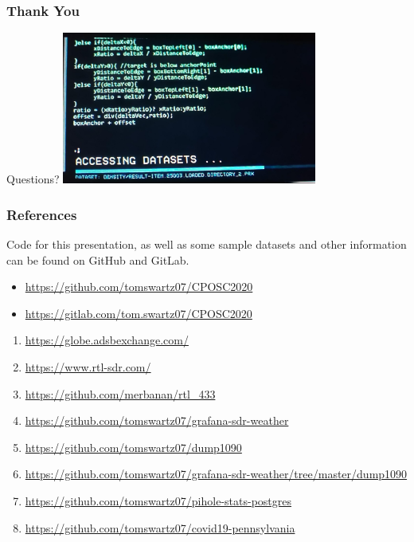 \documentclass[aspectratio=169]{beamer}
\begin{document}
\begin{frame}
  \frametitle{Thank You}
  \begin{center}
    \LARGE{Questions?}
    \vfill
    \includegraphics[height=5cm]{images/lol-code.jpg}
  \end{center}
\end{frame}
\begin{frame}
  \frametitle{References}
  Code for this presentation, as well as some sample datasets and other information
  can be found on GitHub and GitLab.
  \begin{itemize}
    \item{\href{https://github.com/tomswartz07/CPOSC2020}{https://github.com/tomswartz07/CPOSC2020}}
    \item{\href{https://gitlab.com/tom.swartz07/CPOSC2020}{https://gitlab.com/tom.swartz07/CPOSC2020}}
  \end{itemize}
  \vfill
  \begin{enumerate}
    \item{\href{https://globe.adsbexchange.com/}{https://globe.adsbexchange.com/}}
    \item{\href{https://www.rtl-sdr.com/}{https://www.rtl-sdr.com/}}
    \item{\href{https://github.com/merbanan/rtl\_433}{https://github.com/merbanan/rtl\_433}}
    \item{\href{https://github.com/tomswartz07/grafana-sdr-weather}{https://github.com/tomswartz07/grafana-sdr-weather}}
    \item{\href{https://github.com/tomswartz07/dump1090}{https://github.com/tomswartz07/dump1090}}
    \item{\href{https://github.com/tomswartz07/grafana-sdr-weather/tree/master/dump1090}{https://github.com/tomswartz07/grafana-sdr-weather/tree/master/dump1090}}
    \item{\href{https://github.com/tomswartz07/pihole-stats-postgres}{https://github.com/tomswartz07/pihole-stats-postgres}}
    \item{\href{https://github.com/tomswartz07/covid19-pennsylvania}{https://github.com/tomswartz07/covid19-pennsylvania}}
  \end{enumerate}
\end{frame}
\end{document}
